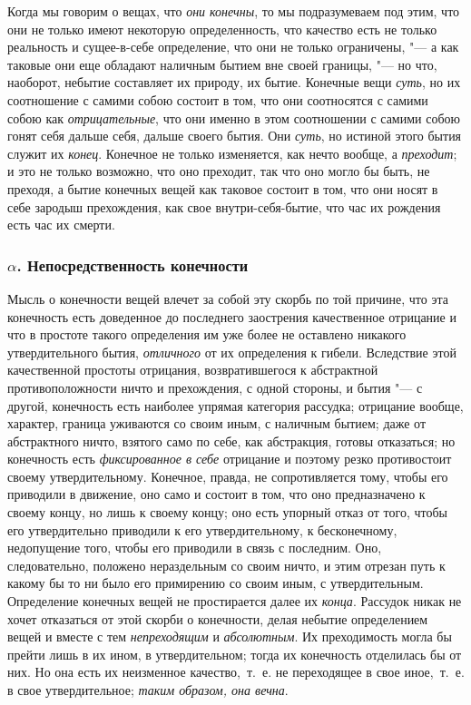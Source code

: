 Когда мы говорим о вещах, что {\em они конечны}, то мы
подразумеваем под этим, что они не только имеют некоторую определенность, 
что качество есть не только реальность и сущее-в-себе определение, что они не
только ограничены, "--- а как таковые они еще обладают наличным бытием вне
своей границы, "--- но что, наоборот, небытие составляет их природу, их бытие.
Конечные вещи {\em суть}, но их соотношение с самими
собою состоит в том, что они соотносятся с самими собою как
{\em отрицательные}, что они именно в этом соотношении
с самими собою гонят себя дальше себя, дальше своего бытия. Они
{\em суть}, но истиной этого бытия служит их
{\em конец}. Конечное не только изменяется, как нечто
вообще, а {\em преходит}; и это не только возможно, что
оно преходит, так что оно могло бы быть, не преходя, а бытие конечных вещей
как таковое состоит в том, что они носят в себе зародыш прехождения, как
свое внутри-себя-бытие, что час их рождения есть час их смерти.

\subsubsection[$\alpha $. Непосредственность конечности]{$\alpha $. Непосредственность конечности}

Мысль о конечности вещей влечет за собой эту скорбь по той причине, что эта
конечность есть доведенное до последнего заострения качественное отрицание
и что в простоте такого определения им уже более не оставлено никакого
утвердительного бытия, {\em отличного} от их
определения к гибели. Вследствие этой качественной простоты отрицания,
возвратившегося к абстрактной противоположности ничто и прехождения, с
одной стороны, и бытия "--- с другой, конечность есть наиболее упрямая
категория рассудка; отрицание вообще, характер, граница уживаются со своим
иным, с наличным бытием; даже от абстрактного ничто, взятого само по
себе, как абстракция, готовы отказаться; но конечность есть
{\em фиксированное в себе} отрицание и поэтому резко
противостоит своему утвердительному. Конечное, правда, не сопротивляется
тому, чтобы его приводили в движение, оно само и состоит в том, что оно
предназначено к своему концу, но лишь к своему концу; оно есть упорный
отказ от того, чтобы его утвердительно приводили к его утвердительному, к
бесконечному, недопущение того, чтобы его приводили в связь с последним.
Оно, следовательно, положено нераздельным со своим ничто, и этим отрезан
путь к какому бы то ни было его примирению со своим иным, с
утвердительным. Определение конечных вещей не простирается далее их
{\em конца}. Рассудок никак не хочет отказаться от этой
скорби о конечности, делая небытие определением вещей и вместе с тем
{\em непреходящим} и
{\em абсолютным}. Их преходимость могла бы прейти лишь
в их ином, в утвердительном; тогда их конечность отделилась бы от них. Но
она есть их неизменное качество,~т.~е. не переходящее в свое иное,~т.~е.
в свое утвердительное; {\em таким образом, она вечна}.

